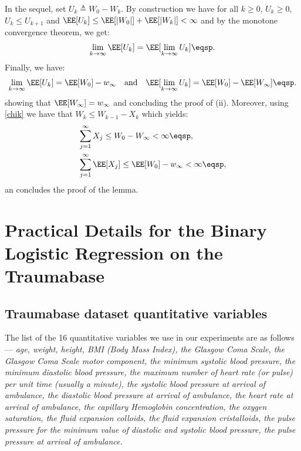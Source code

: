 \documentclass{article}
\makeatletter
\renewenvironment{proof}[1][\proofname]{%
   \par\pushQED{\qed}\normalfont%
   \topsep6\p@\@plus6\p@\relax
   \trivlist\item[\hskip\labelsep\bfseries#1]%
   \ignorespaces
}{%
   \popQED\endtrivlist\@endpefalse
}
\makeatother
\begin{document}
\begin{proof}
In the sequel, set $U_k \triangleq W_0 - W_k$. By construction we have for all $k \geq 0$, $U_k \geq 0$, $U_k \leq U_{k+1}$ and $\EE[U_k] \leq \EE[|W_0|] + \EE[|W_k|] < \infty$ and by the monotone convergence theorem, we get:
\begin{equation}
    \lim \limits_{k \to \infty} \EE[U_k] = \EE[\lim \limits_{k \to \infty}U_k]\eqsp.
\end{equation}
Finally, we have:
\begin{equation}
\lim \limits_{k \to \infty} \EE[U_k] = \EE[W_0] - w_{\infty} \quad \textrm{and} \quad \EE[\lim \limits_{k \to \infty}U_k] = \EE[W_0] - \EE[W_{\infty}] \eqsp.
\end{equation}
showing that $\EE[W_{\infty}] = w_{\infty}$ and concluding the proof of (ii). Moreover, using \eqref{chik} we have that $W_k \leq W_{k-1} - X_k$ which yields:
\begin{equation}
\begin{split}
    & \sum_{j=1}^{\infty}{X_j} \leq W_{0} - W_{\infty} < \infty \eqsp,\\
    & \sum_{j=1}^{\infty}{\EE[X_j]} \leq \EE[W_{0}] - w_{\infty} < \infty\eqsp,
\end{split}
\end{equation}
an concludes the proof of the lemma.
\end{proof}

\vspace{0.2in}

 \section{Practical Details for the Binary Logistic Regression on the Traumabase}
 
 \subsection{Traumabase dataset quantitative variables}\label{appendix:variables}
  The list of the 16 quantitative variables we use in our experiments are as follows --- \textit{age, weight, height, BMI (Body Mass Index), the Glasgow Coma Scale, the Glasgow Coma Scale motor component, the minimum systolic blood pressure, the minimum diastolic blood pressure, the maximum number of heart rate (or pulse) per unit time (usually a minute), the systolic blood pressure at arrival of ambulance, the diastolic blood pressure at arrival of ambulance, the heart rate at arrival of ambulance, the capillary Hemoglobin concentration, the oxygen saturation, the fluid expansion colloids, the fluid expansion cristalloids, the pulse pressure for the minimum value of diastolic and systolic blood pressure, the pulse pressure at arrival of ambulance.}
\end{document}
